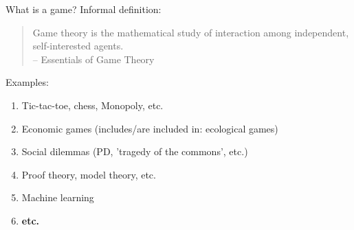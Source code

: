 \begin{framecard}
	{\color{white}
	\bfseries

	}
\end{framecard}


\begin{frame}{What is a game?}
	Informal definition:

	\vfill
	\begin{quotation}
		Game theory is the mathematical study of interaction among independent, self-interested agents.\\
		{\color{colornote}-- Essentials of Game Theory \cite{leyton2008essentials}}
	\end{quotation}

	\vfill
	Examples:
	\begin{enumerate}
		\item Tic-tac-toe, chess, Monopoly, etc.
		\item Economic games (includes/are included in: ecological games)
		\item Social dilemmas (PD, 'tragedy of the commons', etc.)
		\item Proof theory, model theory, etc.
		\item Machine learning
		\item \textbf{etc.}
	\end{enumerate}
\end{frame}

